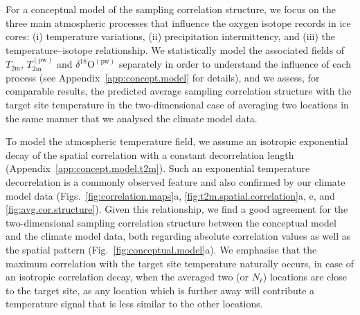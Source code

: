 \documentclass[cp, manuscript]{copernicus}
\begin{document}
For a conceptual model of the sampling correlation structure, we focus on the
three main atmospheric processes that influence the oxygen isotope records in
ice cores: (i) temperature variations, (ii) precipitation intermittency, and
(iii) the temperature--isotope relationship. We statistically model the
associated fields of $T_{\mathrm{2m}}$, $T_{2\mathrm{m}}^{\mathrm{(pw)}}$ and
$\delta^{18}\mathrm{O}^{\mathrm{(pw)}}$ separately in order to understand the
influence of each process (see Appendix~\ref{app:concept.model} for details),
and we assess, for comparable results, the predicted average sampling
correlation structure with the target site temperature in the two-dimensional
case of averaging two locations in the same manner that we analysed the climate
model data.

To model the atmospheric temperature field, we assume an isotropic exponential
decay of the spatial correlation with a constant decorrelation length
(Appendix~\ref{app:concept.model.t2m}). Such an exponential temperature
decorrelation is a commonly observed feature \citep{Jones1997} and also
confirmed by our climate model data (Figs.~\ref{fig:correlation.maps}a,
\ref{fig:t2m.spatial.correlation}a, e, and \ref{fig:avg.cor.structure}). Given
this relationship, we find a good agreement for the two-dimensional sampling
correlation structure between the conceptual model and the climate model data,
both regarding absolute correlation values as well as the spatial pattern
(Fig.~\ref{fig:conceptual.model}a). We emphasise that the maximum correlation
with the target site temperature naturally occurs, in case of an isotropic
correlation decay, when the averaged two (or $N_{\ell}$) locations are close to
the target site, as any location which is further away will contribute a
temperature signal that is less similar to the other locations.
\end{document}
